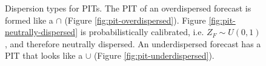\begin{figure}[h]%
    \centering
    \caption[Dispersion types for PITs]{Dispersion types for PITs. The PIT of an overdispersed forecast is formed like a \(\cap\) (Figure \ref{fig:pit-overdispersed}). 
    Figure \ref{fig:pit-neutrally-dispersed} is probabilistically calibrated, i.e. \(Z_F \sim U(0,1)\), and therefore neutrally dispersed. 
    An underdispersed forecast has a PIT that looks like a \(\cup\) (Figure \ref{fig:pit-underdispersed}).}%
    \label{fig:dispersion}%
\end{figure}
